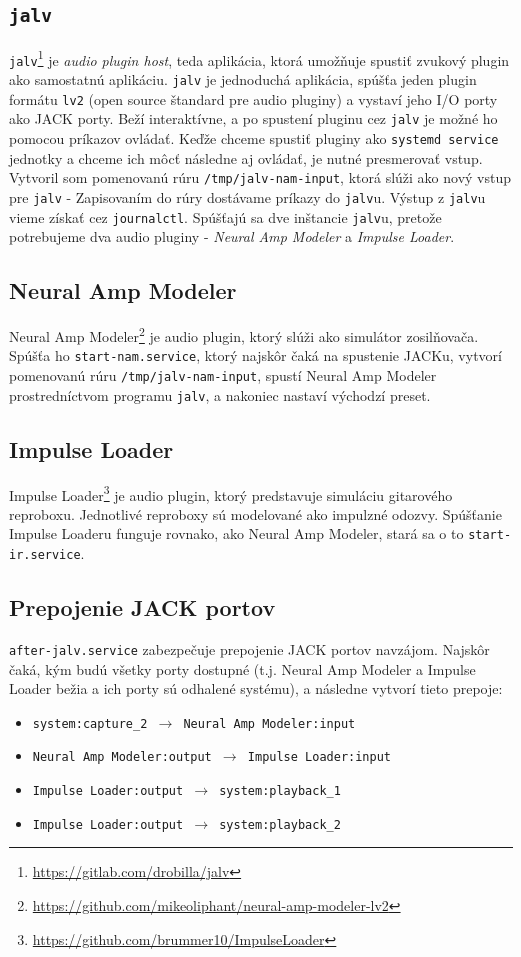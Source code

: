 \documentclass{article}
\begin{document}
\subsection{\texttt{jalv}}
\texttt{jalv}\footnote{\url{https://gitlab.com/drobilla/jalv}} je \textit{audio plugin host}, teda aplikácia, ktorá umožňuje spustiť zvukový plugin ako samostatnú aplikáciu. \texttt{jalv} je jednoduchá aplikácia, spúšťa jeden plugin formátu \texttt{lv2} (open source štandard pre audio pluginy) a vystaví jeho I/O porty ako JACK porty. Beží interaktívne, a po spustení pluginu cez \texttt{jalv} je možné ho pomocou príkazov ovládať. Keďže chceme spustiť pluginy ako \texttt{systemd service} jednotky a chceme ich môcť následne aj ovládať, je nutné presmerovať vstup. Vytvoril som pomenovanú rúru \texttt{/tmp/jalv-nam-input}, ktorá slúži ako nový vstup pre \texttt{jalv} - Zapisovaním do rúry dostávame príkazy do \texttt{jalv}u. Výstup z \texttt{jalv}u vieme získať cez \texttt{journalctl}. Spúšťajú sa dve inštancie \texttt{jalv}u, pretože potrebujeme dva audio pluginy - \textit{Neural Amp Modeler} a \textit{Impulse Loader}.

\subsection{Neural Amp Modeler}
Neural Amp Modeler\footnote{\url{https://github.com/mikeoliphant/neural-amp-modeler-lv2}} je audio plugin, ktorý slúži ako simulátor zosilňovača. Spúšťa ho \texttt{start-nam.service}, ktorý najskôr čaká na spustenie JACKu, vytvorí pomenovanú rúru \texttt{/tmp/jalv-nam-input}, spustí Neural Amp Modeler prostredníctvom programu \texttt{jalv}, a nakoniec nastaví východzí preset.

\subsection{Impulse Loader}
Impulse Loader\footnote{\url{https://github.com/brummer10/ImpulseLoader}} je audio plugin, ktorý predstavuje simuláciu gitarového reproboxu. Jednotlivé reproboxy sú modelované ako impulzné odozvy. Spúšťanie Impulse Loaderu funguje rovnako, ako Neural Amp Modeler, stará sa o to \texttt{start-ir.service}.

\subsection{Prepojenie JACK portov}
\texttt{after-jalv.service} zabezpečuje prepojenie JACK portov navzájom. Najskôr čaká, kým budú všetky porty dostupné (t.j. Neural Amp Modeler a Impulse Loader bežia a ich porty sú odhalené systému), a následne vytvorí tieto prepoje:
\begin{itemize}
    \item \texttt{system:capture\_2 $\rightarrow$ Neural Amp Modeler:input}
    \item \texttt{Neural Amp Modeler:output $\rightarrow$ Impulse Loader:input}
    \item \texttt{Impulse Loader:output $\rightarrow$ system:playback\_1}
    \item \texttt{Impulse Loader:output $\rightarrow$ system:playback\_2}
\end{itemize}
\end{document}
